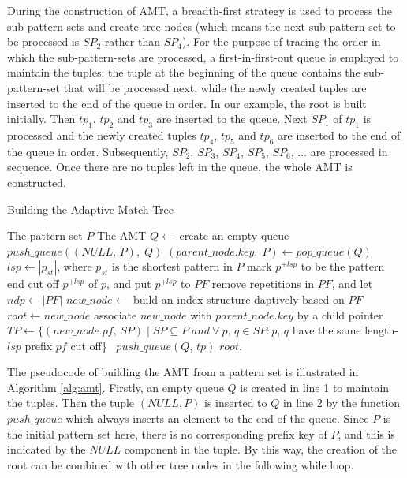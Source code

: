 \documentclass[legalpaper]{article}
\begin{document}
During the construction of \textsf{AMT}, a \textsf{breadth-first}
strategy is used to process the sub-pattern-sets and create tree nodes
(which means the next sub-pattern-set to be processed is $SP_2$ rather
than $SP_4$). For the purpose of tracing the order in which the
sub-pattern-sets are processed, a \textsf{first-in-first-out} queue is
employed to maintain the tuples: the tuple at the beginning of the
queue contains the sub-pattern-set that will be processed next, while
the newly created tuples are inserted to the end of the queue in
order. In our example, the root is built initially. Then $tp_1$,
$tp_2$ and $tp_3$ are inserted to the queue. Next $SP_1$ of $tp_1$ is
processed and the newly created tuples $tp_4$, $tp_5$ and $tp_6$ are
inserted to the end of the queue in order. Subsequently, $SP_2$,
$SP_3$, $SP_4$, $SP_5$, $SP_6$, $\dots$ are processed in
sequence. Once there are no tuples left in the queue, the whole
\textsf{AMT} is constructed.

\begin{algorithm}
  \caption{Building the Adaptive Match Tree}
  \label{alg:amt}
  \begin{algorithmic}[1]
    \REQUIRE The pattern set $P$
    \ENSURE The AMT
    \STATE $Q \leftarrow$ create an empty queue
    \STATE $push\_queue((NULL,\,P),\; Q)$
    \STATE
    \STATE $(parent\_node.key,\; P) \leftarrow pop\_queue(Q)$
    \STATE $lsp \leftarrow |p_{st}|$, where $p_{st}$ is the shortest pattern in $P$
    \STATE mark $p^{+lsp}$ to be the pattern end
    \ENDIF
    \STATE cut off $p^{+lsp}$ of $p$, and put $p^{+lsp}$ to $PF$
    \ENDFOR
    \STATE remove repetitions in $PF$, and let $ndp \leftarrow |PF|$
    \STATE $new\_node \leftarrow$ build an index structure daptively
    based on $PF$
    \STATE $root \leftarrow new\_node$
    \ELSE
    \STATE associate $new\_node$ with $parent\_node.key$ by a child pointer
    \ENDIF
    \STATE $TP \leftarrow \{(new\_node.pf,\, SP) \mid SP \subseteq P\; and
    \ \forall \ p,\,q \in SP: p,\,q$ have the same length-$lsp$ prefix
    $pf$ cut off\}\
    \STATE $push\_queue(Q,\,tp)$
    \ENDFOR
    \ENDWHILE
    \STATE
    \RETURN $root$.
  \end{algorithmic}
\end{algorithm}

The pseudocode of building the \textsf{AMT} from a pattern set is
illustrated in Algorithm \ref{alg:amt}. Firstly, an empty queue $Q$ is
created in line 1 to maintain the tuples. Then the tuple $(NULL, P)$
is inserted to $Q$ in line 2 by the function $push\_queue$ which
always inserts an element to the end of the queue. Since $P$ is the
initial pattern set here, there is no corresponding prefix key of $P$,
and this is indicated by the $NULL$ component in the tuple. By this
way, the creation of the root can be combined with other tree nodes in
the following \textsf{while} loop.
\end{document}
